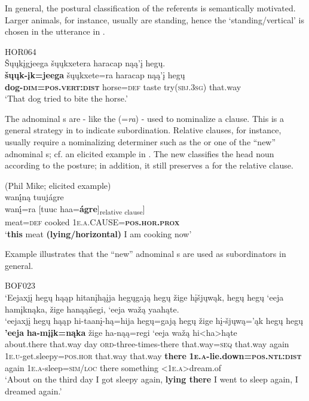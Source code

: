 \documentclass[output=paper]{langsci/langscibook}
\begin{document}
In general, the postural classification of the referents is semantically motivated. Larger animals, for instance, usually are standing, hence the `standing\slash vertical'  is chosen in the utterance in .

 \ea \label{ex:helmbrecht:12}
HOR064\\
\glll Šųųkįgjeega šųųkxetera haracap nąą'į hegų.\\
\textbf{šųųk-įk=jeega}                     šųųkxete=ra  haracap nąą'į               hegų\\
\textbf{dog-\textsc{dim}=\textsc{pos}.\textsc{vert}:\textsc{dist}}  horse=\textsc{def}    taste        try(\textsc{sbj}.\textsc{3sg})  that.way\\
\glt   `That dog tried to bite the horse.'
\z


The adnominal s are - like the  (=\textit{ra}) - used to nominalize a clause. This is a general strategy in  to indicate subordination. Relative clauses, for instance, usually require a nominalizing determiner such as the  or one of the ``new'' adnominal s; cf. an elicited example in . The new  classifies the head noun according to the posture; in addition, it still preserves a  for the relative clause. 

\ea \label{ex:helmbrecht:13}
(Phil Mike; elicited example)\\
\glll  wan\'{\k{i}}ną tuujágre\\
{\ob}wan\'{\k{i}}=ra [{tuuc      haa=\textbf{{ágre}}}]\textsubscript{relative clause}]\\
  meat=\textsc{def}    cooked  \textsc{1e.a}.CAUSE=\textbf{\textsc{pos}.\textsc{hor}.\textsc{prox}}\\
  \glt `\textbf{this} meat \textbf{(lying/horizontal)} I am cooking now'
\z

Example  illustrates that the ``new'' adnominal s are used as subordinators in general. 

 
\ea \label{ex:helmbrecht:14}
BOF023\\
\glll `Eejaxjį hegų hąąp hitanįhąįja hegųgają hegų žige hįšjųwąk, hegų hegų `eeja       hamįknąka, žige hanąąňegi, `eeja wažą yaahąte.\\
    `eejaxjį        hegų       hąąp   hi-taanį-hą=hija hegų=gają  hegų        žige     hį-šjųwą='ąk                       hegų  hegų \textbf{'eeja} \textbf{ha-mįįk=nąka}                      žige   ha-nąą=regi  `eeja   wažą         hi<ha>hąte  \\
    about.there that.way  day    \textsc{ord}-three-times-there    that.way=\textsc{seq}    that.way  again  \textsc{1e.u}-get.sleepy=\textsc{pos}.\textsc{hor}  that.way    that.way  \textbf{there}  \textbf{\textsc{1e.a}}\textbf{-lie.down=}\textbf{\textsc{pos.ntl}:\textsc{dist}}  again  \textsc{1e.a}-sleep=\textsc{sim/loc}  there something <\textsc{1e.a}>dream.of\\
\glt  `About on the third day I got sleepy again, \textbf{lying there} I went to sleep again, I     dreamed again.'
\z
\end{document}

